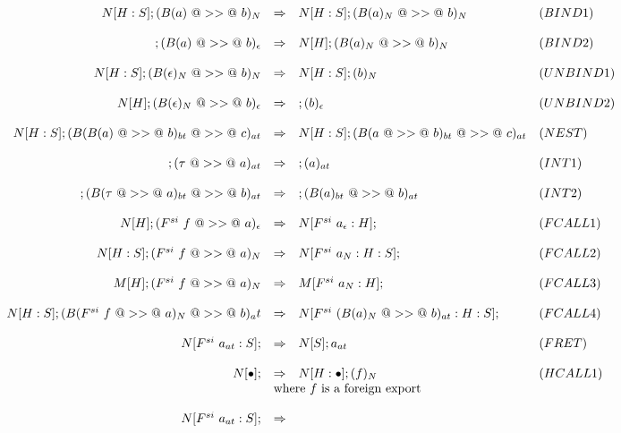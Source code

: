 \documentclass{article}
\newcommand{\hcall}{H}
\newcommand{\fcall}[2]{F^{#1}~#2}
\newcommand{\bound}[1]{B(#1)}
\begin{document}
$$
\begin{array}{rcll}
N[\hcall:S]; (\bound{a}~@>>@~b)_{N} 
	& \Rightarrow 
	& N[\hcall:S]; (\bound{a}_N~@>>@~b)_{N} & (BIND1) \\
\\
; (\bound{a}~@>>@~b)_{\epsilon} 
	& \Rightarrow 
	& N[\hcall]; (\bound{a}_N~@>>@~b)_{N} & (BIND2) \\
\\
N[\hcall:S]; (\bound{\epsilon}_N~@>>@~b)_N 
	& \Rightarrow 
	& N[\hcall:S]; (b)_N & (UNBIND1) \\
\\
N[\hcall]; (\bound{\epsilon}_N~@>>@~b)_{\epsilon} 
	& \Rightarrow 
	& ; (b)_{\epsilon} & (UNBIND2) \\
\\
N[\hcall:S]; (\bound{\bound{a}~@>>@~b}_{bt}~@>>@~c)_{at} 
	& \Rightarrow 
	& N[\hcall:S]; (\bound{a~@>>@~b}_{bt}~@>>@~c)_{at} & (NEST) \\
\\
; (\tau~@>>@~a)_{at} 
	& \Rightarrow 
	& ; (a)_{at} & (INT1) \\
\\
; (\bound{\tau~@>>@~a}_{bt}~@>>@~b)_{at} 
	& \Rightarrow 
	& ; (\bound{a}_{bt}~@>>@~b)_{at} & (INT2) \\
\\
N[\hcall]; (\fcall{si}{f}~@>>@~a)_{\epsilon} 
	& \Rightarrow 
	& N[\fcall{si}{a_\epsilon}:\hcall];  & (FCALL1) \\
\\
N[\hcall:S]; (\fcall{si}{f}~@>>@~a)_N 
	& \Rightarrow 
	& N[\fcall{si}{a_N}:\hcall:S];  & (FCALL2) \\
\\
M[\hcall]; (\fcall{si}{f}~@>>@~a)_N
	& \Rightarrow 
	& M[\fcall{si}{a_N}:\hcall];  & (FCALL3) \\
\\
N[\hcall:S]; (\bound{\fcall{si}{f}~@>>@~a}_N~@>>@~b)_at
	& \Rightarrow 
	& N[\fcall{si}{(\bound{a}_N~@>>@~b)_{at}}:\hcall:S];  & (FCALL4) \\
\\
N[\fcall{si}{a_{at}}:S];  
	& \Rightarrow 
	& N[S]; a_{at} & (FRET) \\
\\
N[\bullet];
	& \Rightarrow 
	& N[\hcall:\bullet];  (f)_{N} & (HCALL1) \\
	& \multicolumn{2}{l}{\mbox{where $f$ is a foreign export}} \\
\\
N[\fcall{si}{a_{at}} : S]; 
	& \Rightarrow 

\end{array}$$
\end{document}
